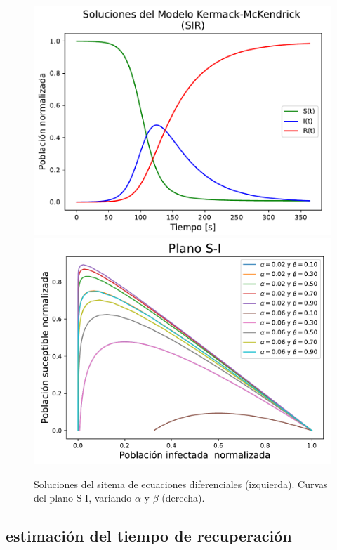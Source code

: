 \documentclass[10pt,oneside]{article}
\begin{document}
\begin{multicols}{2}
      \begin{figure}
          \centering
          \includegraphics[scale=0.5]{Figuras/f1.pdf}\hspace{0.5cm}
          \includegraphics[scale=0.45]{Figuras/f2.pdf}
          \caption{Soluciones del sitema de ecuaciones diferenciales (izquierda). Curvas del plano S-I, variando $\alpha$ y $\beta$ (derecha).}
          \label{fig:1}
      \end{figure}

    \subsection{estimación del tiempo de recuperación}
    

\end{multicols}
\end{document}
